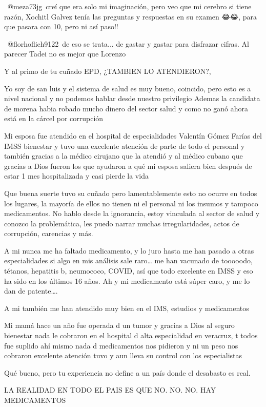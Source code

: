 ​ @meza73jg creí que era solo mi imaginación, pero veo que mi cerebro si tiene razón, Xochitl Galvez tenía las preguntas y respuestas en su examen 😂😂, para que pasara con 10, pero ni así paso!!

​ @florhoflich9122 de eso se trata... de gastar y gastar para disfrazar cifras. Al parecer Tadei no es mejor que Lorenzo

Y al primo de tu cuñado EPD, ¿TAMBIEN LO ATENDIERON?,

Yo soy de san luis y el sistema de salud es muy bueno, coincido, pero esto es a nivel nacional y no podemos hablar desde nuestro privilegio
Ademas la candidata de morena habia robado mucho dinero del sector salud y como no ganó ahora está en la cárcel por corrupción

Mi esposa fue atendido en el hospital de especialidades Valentín Gómez Farías del IMSS bienestar y tuvo una excelente atención de parte de todo el personal y también gracias a la médico cirujano que la atendió y al médico cubano que gracias a Dios fueron los que ayudaron a qué mi esposa saliera bien después de estar 1 mes hospitalizada y casi pierde la vida

Que buena suerte tuvo su cuñado pero lamentablemente esto no ocurre en todos los lugares, la mayoría de ellos no tienen ni el personal ni los insumos y tampoco medicamentos. No hablo desde la ignorancia, estoy vinculada al sector de salud y conozco la problemática, les puedo narrar muchas irregularidades, actos de corrupción, carencias y más.

A mi nunca me ha faltado medicamento, y lo juro hasta me han pasado a otras especialidades si algo en mis análisis sale raro… me han vacunado de tooooodo, tétanos, hepatitis b, neumococo, COVID, así que todo excelente en IMSS y eso ha sido en los últimos 16 años. Ah y mi medicamento está súper caro, y me lo dan de patente….

A mi también me han atendido muy bien en el IMS, estudios y medicamentos 👌🏼👍🏼

Mi mamá hace un año fue operada d un tumor y gracias a Dios al seguro bienestar nada le cobraron en el hospital d alta especialidad en veracruz, t todos fue suplido ahí mismo nada d medicamentos nos pidieron y ni un peso nos cobraron excelente atención tuvo y aun lleva su control con los especialistas

Qué bueno, pero tu experiencia no define a un país donde el desabasto es real.

LA REALIDAD EN TODO EL PAIS ES QUE NO. NO.  NO. HAY MEDICAMENTOS

